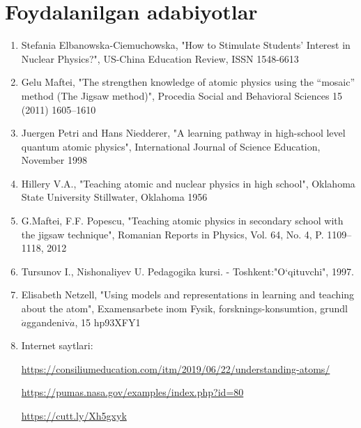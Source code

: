 \documentclass[epsf]{article}
\begin{document}
\section{Foydalanilgan adabiyotlar}
\begin{enumerate}
	\item Stefania Elbanowska-Ciemuchowska, "How to Stimulate Students’ Interest in Nuclear Physics?", US-China Education Review, ISSN 1548-6613
	\item Gelu Maftei, "The strengthen knowledge of atomic physics using the “mosaic” 	method (The Jigsaw method)", Procedia Social and Behavioral Sciences 15 (2011) 1605–1610
	\item Juergen Petri and Hans Niedderer, "A learning pathway in high-school level quantum atomic
	physics", International Journal of Science Education, November 1998
	\item Hillery V.A., "Teaching atomic and nuclear physics in high school", Oklahoma State University
	Stillwater, Oklahoma
	1956
	\item G.Maftei, F.F. Popescu, "Teaching atomic physics in secondary school with the jigsaw technique", Romanian Reports in Physics, Vol. 64, No. 4, P. 1109–1118, 2012
	\item Tursunov I., Nishonaliyev U. Pedagogika kursi. - Toshkent:"O`qituvchi", 1997.
	\item Elisabeth Netzell, "Using models and representations in learning and teaching about the atom", Examensarbete inom Fysik, forsknings-konsumtion, grundl $\ddot a$ggandeniv$\dot a$, 15 hp93XFY1
	\item Internet saytlari:
	
 \href{https://consiliumeducation.com/itm/2019/06/22/understanding-atoms/}{https://consiliumeducation.com/itm/2019/06/22/understanding-atoms/}
 
 \href{https://pumas.nasa.gov/examples/index.php?id=80}{https://pumas.nasa.gov/examples/index.php?id=80}
 
 \href{https://cutt.ly/Xh5gxyk}{https://cutt.ly/Xh5gxyk}
\end{enumerate}
\end{document}
